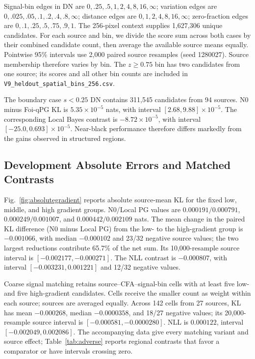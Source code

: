 \documentclass[10pt,twocolumn,journal]{IEEEtran}
\begin{document}
Signal-bin edges in DN are $0,.25,.5,1,2,4,8,16,\infty$; variation edges are $0,.025,.05,.1,.2,.4,.8,\infty$; distance edges are $0,1,2,4,8,16,\infty$; zero-fraction edges are $0,.1,.25,.5,.75,.9,1$. The 256-pixel context supplies 1,627,306 unique candidates. For each source and bin, we divide the score sum across both cases by their combined candidate count, then average the available source means equally. Pointwise 95\% intervals use 2,000 paired source resamples (seed 1280027). Source membership therefore varies by bin. The $z\geq0.75$ bin has two candidates from one source; its scores and all other bin counts are included in \texttt{V9\_heldout\_spatial\_bins\_256.csv}.

The boundary case $s<0.25$ DN contains 311,545 candidates from 94 sources. N0 minus Foi-qPG KL is $5.35\times10^{-5}$ nats, with interval $[2.68,9.88]\times10^{-5}$. The corresponding Local Bayes contrast is $-8.72\times10^{-5}$, with interval $[-25.0,0.693]\times10^{-5}$. Near-black performance therefore differs markedly from the gains observed in structured regions.

\subsection{Development Absolute Errors and Matched Contrasts}
Fig.~\ref{fig:absolutegradient} reports absolute source-mean KL for the fixed low, middle, and high gradient groups. N0/Local PG values are $0.000191/0.000791$, $0.000249/0.001007$, and $0.000442/0.002109$ nats. The mean change in the paired KL difference (N0 minus Local PG) from the low- to the high-gradient group is $-0.001066$, with median $-0.000102$ and 23/32 negative source values; the two largest reductions contribute 65.7\% of the net sum. Its 10,000-resample source interval is $[-0.002177,-0.000271]$. The NLL contrast is $-0.000807$, with interval $[-0.003231,0.001221]$ and 12/32 negative values.

Coarse signal matching retains source--CFA--signal-bin cells with at least five low- and five high-gradient candidates. Cells receive the smaller count as weight within each source; sources are averaged equally. Across 142 cells from 27 sources, KL has mean $-0.000268$, median $-0.0000358$, and 18/27 negative values; its 20,000-resample source interval is $[-0.000581,-0.0000280]$. NLL is $0.000122$, interval $[-0.002049,0.002086]$. The accompanying data give every matching variant and source effect; Table~\ref{tab:adverse} reports regional contrasts that favor a comparator or have intervals crossing zero.
\end{document}
